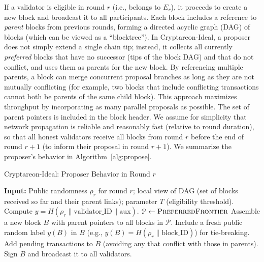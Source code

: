 If a validator is eligible in round $r$ (i.e., belongs to $E_r$), it proceeds to create a new block and broadcast it to all participants. Each block includes a reference to \emph{parent} blocks from previous rounds, forming a directed acyclic graph (DAG) of blocks (which can be viewed as a ``blocktree''). In Cryptareon-Ideal, a proposer does not simply extend a single chain tip; instead, it collects all currently \emph{preferred} blocks that have no successor (tips of the block DAG) and that do not conflict, and uses them as parents for the new block. By referencing multiple parents, a block can merge concurrent proposal branches as long as they are not mutually conflicting (for example, two blocks that include conflicting transactions cannot both be parents of the same child block). This approach maximizes throughput by incorporating as many parallel proposals as possible. The set of parent pointers is included in the block header. We assume for simplicity that network propagation is reliable and reasonably fast (relative to round duration), so that all honest validators receive all blocks from round $r$ before the end of round $r+1$ (to inform their proposal in round $r+1$). We summarize the proposer’s behavior in Algorithm~\ref{alg:propose}. 

\begin{algorithm}[t]
\caption{Cryptareon-Ideal: Proposer Behavior in Round $r$}\label{alg:propose}
\begin{algorithmic}[1]
\State \textbf{Input:} Public randomness $\rho_r$ for round $r$; local view of DAG (set of blocks received so far and their parent links); parameter $T$ (eligibility threshold).
\State Compute $y = H(\rho_r \parallel \text{validator\_ID} \parallel \text{aux})$.
 
    \State $\mathcal{P} \gets \Call{PreferredFrontier}{}$ 
    \State Assemble a new block $B$ with parent pointers to all blocks in $\mathcal{P}$.
    \State Include a fresh public random label $y(B)$ in $B$ (e.g., $y(B)=H(\rho_r \parallel \text{block\_ID})$) for tie-breaking.
    \State Add pending transactions to $B$ (avoiding any that conflict with those in parents).
    \State Sign $B$ and broadcast it to all validators.
\EndIf
\end{algorithmic}
\end{algorithm}

